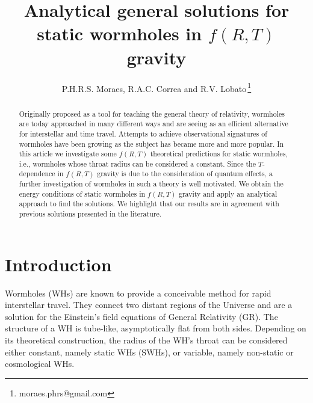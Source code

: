 \documentclass[aps,preprint,onecolumn,11pt,showkeys]{revtex4}%
\begin{document}
\title{Analytical general solutions for static wormholes in $f(R,T)$ gravity}
\author{P.H.R.S. Moraes, R.A.C. Correa and R.V. Lobato$^{}\medskip$\thanks{moraes.phrs@gmail.com}}
\begin{abstract}
Originally proposed as a tool for teaching the general theory of relativity,
wormholes are today approached in many different ways and are seeing as an
efficient alternative for interstellar and time travel. Attempts to achieve
observational signatures of wormholes have been growing as the subject has
became more and more popular. In this article we investigate some $f(R,T)$
theoretical predictions for static wormholes, i.e., wormholes whose throat
radius can be considered a constant. Since the $T$-dependence in $f(R,T)$
gravity is due to the consideration of quantum effects, a further
investigation of wormholes in such a theory is well motivated. We obtain the energy conditions of static wormholes in $f(R,T)$ gravity and apply an analytical approach to find the solutions. We highlight that our results are in agreement with
previous solutions presented in the literature.

\end{abstract}
\maketitle


\section{Introduction}

\label{sec:int}

Wormholes (WHs) are known to provide a conceivable method for rapid
interstellar travel. They connect two distant regions of the Universe and are
a solution for the Einstein's field equations of General Relativity (GR). The
structure of a WH is tube-like, asymptotically flat from both sides. Depending
on its theoretical construction, the radius of the WH's throat can be
considered either constant, namely static WHs (SWHs), or variable, namely
non-static or cosmological WHs.
\end{document}
